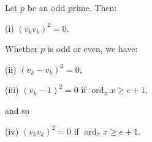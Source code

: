 Let $p$ be an odd prime. Then:

(i) $(v_k v_k)^2 = 0$.

Whether $p$ is odd or even, we have:

(ii) $(v_k - v_k)^2 = 0$,

(iii) $(v_k - 1)^2 = 0$ if $\operatorname{ord}_\pi x \geq e + 1$,

and so

(iv) $(v_k v_k)^2 = 0$ if $\operatorname{ord}_\pi x \geq e + 1$.
